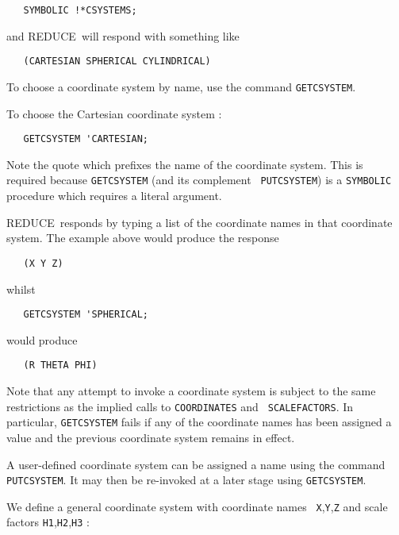 \documentclass[11pt,letterpaper]{book}
\newcommand{\REDUCE}{REDUCE}
\begin{document}
{\small\begin{verbatim}
   SYMBOLIC !*CSYSTEMS;
\end{verbatim}}

and \REDUCE\ will respond with something like

{\small\begin{verbatim}
   (CARTESIAN SPHERICAL CYLINDRICAL)
\end{verbatim}}

To choose a coordinate system by name, use the command {\tt GETCSYSTEM}.

To choose the Cartesian coordinate system :
{\small\begin{verbatim}
   GETCSYSTEM 'CARTESIAN;
\end{verbatim}}

Note the quote which prefixes the name of the coordinate system. This
is required because {\tt GETCSYSTEM} (and its complement {\tt
PUTCSYSTEM}) is a {\tt SYMBOLIC} procedure which requires a literal
argument.

\REDUCE\ responds by typing a list of the coordinate names in that
coordinate system. The example above would produce the response

{\small\begin{verbatim}
   (X Y Z)
\end{verbatim}}

whilst

{\small\begin{verbatim}
   GETCSYSTEM 'SPHERICAL;
\end{verbatim}}

would produce

{\small\begin{verbatim}
   (R THETA PHI)
\end{verbatim}}

Note that any attempt to invoke a coordinate system is subject to the
same restrictions as the implied calls to {\tt COORDINATES} and {\tt
SCALEFACTORS}.  In particular, {\tt GETCSYSTEM} fails if any of the
coordinate names has been assigned a value and the previous coordinate
system remains in effect.

A user-defined coordinate system can be assigned a name using the
command {\tt PUTCSYSTEM}. It may then be re-invoked at a later stage using
{\tt GETCSYSTEM}.

\example{}

We define a general coordinate system with coordinate names {\tt
X},{\tt Y},{\tt Z} and scale factors {\tt H1},{\tt H2},{\tt H3} :
\end{document}
